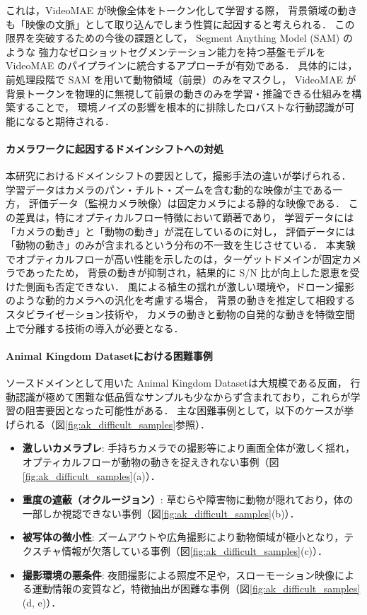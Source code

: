 これは，VideoMAE が映像全体をトークン化して学習する際，
背景領域の動きも「映像の文脈」として取り込んでしまう性質に起因すると考えられる．
この限界を突破するための今後の課題として，
Segment Anything Model (SAM) \cite{kirillov2023segment}  のような
強力なゼロショットセグメンテーション能力を持つ基盤モデルを VideoMAE のパイプラインに統合するアプローチが有効である．
具体的には，前処理段階で SAM を用いて動物領域（前景）のみをマスクし，
VideoMAE が背景トークンを物理的に無視して前景の動きのみを学習・推論できる仕組みを構築することで，
環境ノイズの影響を根本的に排除したロバストな行動認識が可能になると期待される．

\paragraph{カメラワークに起因するドメインシフトへの対処}
本研究におけるドメインシフトの要因として，撮影手法の違いが挙げられる．
学習データはカメラのパン・チルト・ズームを含む動的な映像が主である一方，
評価データ（監視カメラ映像）は固定カメラによる静的な映像である．
この差異は，特にオプティカルフロー特徴において顕著であり，
学習データには「カメラの動き」と「動物の動き」が混在しているのに対し，
評価データには「動物の動き」のみが含まれるという分布の不一致を生じさせている．
本実験でオプティカルフローが高い性能を示したのは，ターゲットドメインが固定カメラであったため，
背景の動きが抑制され，結果的に S/N 比が向上した恩恵を受けた側面も否定できない．
風による植生の揺れが激しい環境や，ドローン撮影のような動的カメラへの汎化を考慮する場合，
背景の動きを推定して相殺するスタビライゼーション技術や，
カメラの動きと動物の自発的な動きを特徴空間上で分離する技術の導入が必要となる．


\paragraph{Animal Kingdom Datasetにおける困難事例}
ソースドメインとして用いた Animal Kingdom Datasetは大規模である反面，
行動認識が極めて困難な低品質なサンプルも少なからず含まれており，これらが学習の阻害要因となった可能性がある．
主な困難事例として，以下のケースが挙げられる（図\ref{fig:ak_difficult_samples}参照）．

\begin{itemize}
    \item \textbf{激しいカメラブレ}: 手持ちカメラでの撮影等により画面全体が激しく揺れ，オプティカルフローが動物の動きを捉えきれない事例（図\ref{fig:ak_difficult_samples}(a)）．
    \item \textbf{重度の遮蔽（オクルージョン）}: 草むらや障害物に動物が隠れており，体の一部しか視認できない事例（図\ref{fig:ak_difficult_samples}(b)）．
    \item \textbf{被写体の微小性}: ズームアウトや広角撮影により動物領域が極小となり，テクスチャ情報が欠落している事例（図\ref{fig:ak_difficult_samples}(c)）．
    \item \textbf{撮影環境の悪条件}: 夜間撮影による照度不足や，スローモーション映像による運動情報の変質など，特徴抽出が困難な事例（図\ref{fig:ak_difficult_samples}(d, e)）．
\end{itemize}

